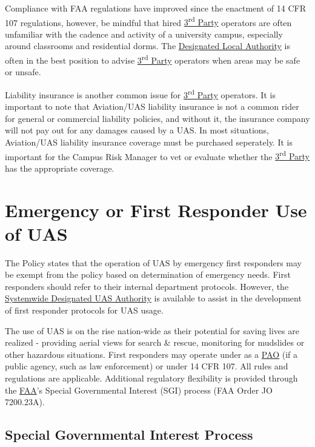 \documentclass[
]{book}
\begin{document}
Compliance with FAA regulations have improved since the enactment of 14 CFR 107 regulations, however, be mindful that hired \protect\hyperlink{rdparty}{3\textsuperscript{rd} Party} operators are often unfamiliar with the cadence and activity of a university campus, especially around classrooms and residential dorms. The \protect\hyperlink{DLA}{Designated Local Authority} is often in the best position to advise \protect\hyperlink{rdparty}{3\textsuperscript{rd} Party} operators when areas may be safe or unsafe.

Liability insurance is another common issue for \protect\hyperlink{rdparty}{3\textsuperscript{rd} Party} operators. It is important to note that Aviation/UAS liability insurance is not a common rider for general or commercial liability policies, and without it, the insurance company will not pay out for any damages caused by a UAS. In most situations, Aviation/UAS liability insurance coverage must be purchased seperately. It is important for the Campus Risk Manager to vet or evaluate whether the \protect\hyperlink{rdparty}{3\textsuperscript{rd} Party} has the appropriate coverage.

\hypertarget{emergency-or-first-responder-use-of-uas}{%
\section{Emergency or First Responder Use of UAS}\label{emergency-or-first-responder-use-of-uas}}

The Policy states that the operation of UAS by emergency first responders may be exempt from the policy based on determination of emergency needs. First responders should refer to their internal department protocols. However, the \protect\hyperlink{SDA}{Systemwide Designated UAS Authority} is available to assist in the development of first responder protocols for UAS usage.

The use of UAS is on the rise nation-wide as their potential for saving lives are realized - providing aerial views for search \& rescue, monitoring for mudslides or other hazardous situations. First responders may operate under as a \protect\hyperlink{PAO}{PAO} (if a public agency, such as law enforcement) or under 14 CFR 107. All rules and regulations are applicable. Additional regulatory flexibility is provided through the \protect\hyperlink{FAA}{FAA}'s Special Governmental Interest (SGI) process (FAA Order JO 7200.23A).

\hypertarget{special-governmental-interest-process}{%
\subsection{Special Governmental Interest Process}\label{special-governmental-interest-process}}
\end{document}
